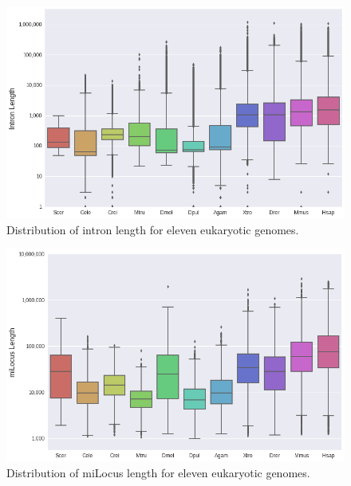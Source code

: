 \begin{figure}[h]
\includegraphics[scale=0.4]{Assets/Graphics/iLoci/modorg-intron-length.png}
\caption{Distribution of intron length for eleven eukaryotic genomes.}
\label{Fig:piLocusIntronLength}
\end{figure}

\begin{figure}[h]
\includegraphics[scale=0.45]{Assets/Graphics/iLoci/modorg-milocus-length.png}
\caption{Distribution of miLocus length for eleven eukaryotic genomes.}
\label{Fig:miLocusLengthModOrg}
\end{figure}

